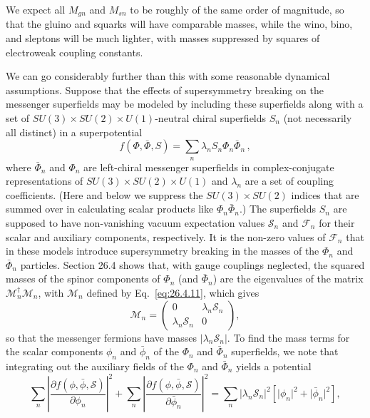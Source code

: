We expect all \(M_{gn}\) and \(M_{sn}\) to be roughly of the same order of
magnitude, so that the gluino and squarks will have comparable masses,
while the wino, bino, and sleptons will be much lighter, with masses
suppressed by squares of electroweak coupling constants.

We can go considerably further than this with some reasonable dynamical
assumptions. Suppose that the effects of supersymmetry breaking on the
messenger superfields may be modeled by including these superfields along
with a set of
\(SU(3)\times SU(2)\times U(1)\)-neutral chiral
superfields \(S_n\) (not necessarily all distinct) in a superpotential
\begin{equation}
  f(\Phi,\bar\Phi,S)=\sum_n\lambda_nS_n\Phi_n\bar\Phi_n\,,
  \tag{28.6.5}\label{eq:28.6.5}
\end{equation}
where \(\bar\Phi_n\) and \(\Phi_n\) are left-chiral messenger superfields
in complex-conjugate representations of
\(SU(3)\times SU(2)\times U(1)\) and \(\lambda_n\) are a
set of coupling coefficients. (Here and below we suppress the
\(SU(3)\times SU(2)\) indices that are summed over in calculating
scalar products like \(\Phi_n\bar\Phi_n\).) The superfields \(S_n\) are
supposed to have non-vanishing vacuum expectation values
\(\mathcal{S}_n\) and \(\mathcal{F}_n\) for their scalar and auxiliary
components, respectively. It is the non-zero values of \(\mathcal{F}_n\)
that in these models introduce supersymmetry breaking in the masses of the
\(\Phi_n\) and \(\bar\Phi_n\) particles. Section 26.4 shows that, with
gauge couplings neglected, the squared masses of the spinor components of
\(\Phi_n\) (and \(\bar\Phi_n\)) are the eigenvalues of the matrix
\(\mathcal{M}_n^\dagger\mathcal{M}_n\), with \(\mathcal{M}_n\) defined by
Eq.~\eqref{eq:26.4.11}, which gives
\[
  \mathcal{M}_n=
  \begin{pmatrix}
    0&\lambda_n\mathcal{S}_n\\
    \lambda_n\mathcal{S}_n&0
  \end{pmatrix},
\]
so that the messenger fermions have masses
\(\lvert\lambda_n\mathcal{S}_n\rvert\). To find the mass terms for the
scalar components \(\phi_n\) and \(\bar\phi_n\) of the \(\Phi_n\) and
\(\bar\Phi_n\) superfields, we note that integrating out the auxiliary
fields of the \(\Phi_n\) and \(\bar\Phi_n\) yields a potential
\[
  \sum_n\left|
    \frac{\partial f(\phi,\bar\phi,\mathcal{S})}{\partial\phi_n}
  \right|^2
  +\sum_n\left|
    \frac{\partial f(\phi,\bar\phi,\mathcal{S})}{\partial\bar\phi_n}
  \right|^2
  =\sum_n\lvert\lambda_n\mathcal{S}_n\rvert^2
    \left[\lvert\phi_n\rvert^2+\lvert\bar\phi_n\rvert^2\right],
\]
